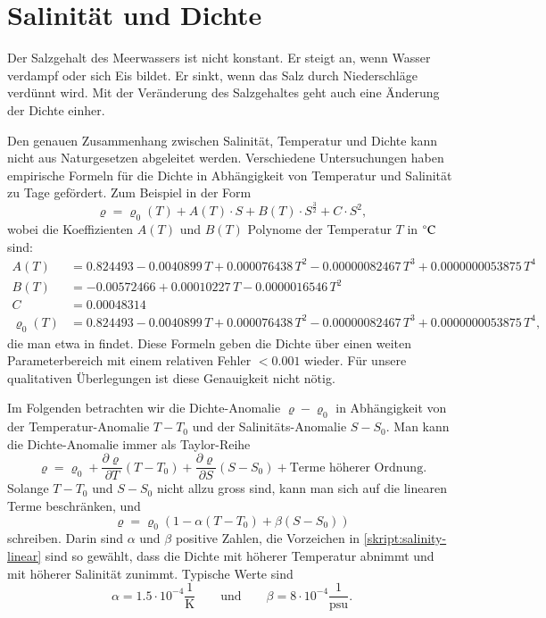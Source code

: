 %
%
%
\section{Salinität und Dichte}
Der Salzgehalt des Meerwassers ist nicht konstant.
Er steigt an, wenn Wasser verdampf oder sich Eis bildet.
Er sinkt, wenn das Salz durch Niederschläge verdünnt wird.
Mit der Veränderung des Salzgehaltes geht auch eine Änderung
der Dichte einher.

Den genauen Zusammenhang zwischen Salinität, Temperatur und Dichte
kann nicht aus Naturgesetzen abgeleitet werden.
Verschiedene Untersuchungen haben empirische Formeln für die
Dichte in Abhängigkeit von Temperatur und Salinität zu Tage
gefördert.
Zum Beispiel  in der Form
\[
\varrho
=
\varrho_0(T)
+
A(T)\cdot S + B(T)\cdot S^{\frac32}+C\cdot S^2,
\]
wobei die Koeffizienten $A(T)$ und $B(T)$ Polynome der Temperatur $T$ in
$\mathstrut^\circ\text{C}$ sind:
\begin{align*}
A(T)
&=
 0.824493 - 0.0040899\,T + 0.000076438\,T^2 - 0.00000082467\,T^3 + 0.0000000053875\,T^4
\\
B(T)
&=
 -0.00572466 + 0.00010227\,T - 0.0000016546\,T^2
\\
C
&=
0.00048314
\\
\varrho_0(T)
&=
 0.824493 - 0.0040899\,T + 0.000076438\,T^2
 - 0.00000082467\,T^3 + 0.0000000053875\,T^4,
\end{align*}
die man etwa in
\cite{skript:millero}
findet.
Diese Formeln geben die Dichte über einen weiten Parameterbereich
mit einem relativen Fehler $<0.001$ wieder.
Für unsere qualitativen Überlegungen ist diese Genauigkeit
nicht nötig.

Im Folgenden betrachten wir die Dichte-Anomalie $\varrho-\varrho_0$
in Abhängigkeit von der Temperatur-Anomalie $T-T_0$ und der
Salinitäts-Anomalie $S-S_0$.
Man kann die Dichte-Anomalie immer als Taylor-Reihe
\[
\varrho 
=
\varrho_0
+
\frac{\partial \varrho}{\partial T}(T-T_0)
+
\frac{\partial \varrho}{\partial S}(S-S_0)
+
\text{Terme höherer Ordnung}.
\]
Solange $T-T_0$ und $S-S_0$ nicht allzu gross sind, kann man sich auf
die linearen Terme beschränken, und
\begin{equation}
\varrho
=
\varrho_0(1-\alpha(T-T_0)+\beta(S-S_0))
\label{skript:salinity-linear}
\end{equation}
schreiben.
Darin sind $\alpha$ und $\beta$ positive Zahlen, die Vorzeichen in
\eqref{skript:salinity-linear} sind so gewählt, dass die Dichte
mit höherer Temperatur abnimmt und mit höherer Salinität zunimmt.
Typische Werte sind
\[
\alpha = 1.5\cdot 10^{-4}\frac{1}{\text{K}}
\qquad
\text{und}
\qquad
\beta = 8\cdot 10^{-4}\frac{1}{\text{psu}}.
\]

